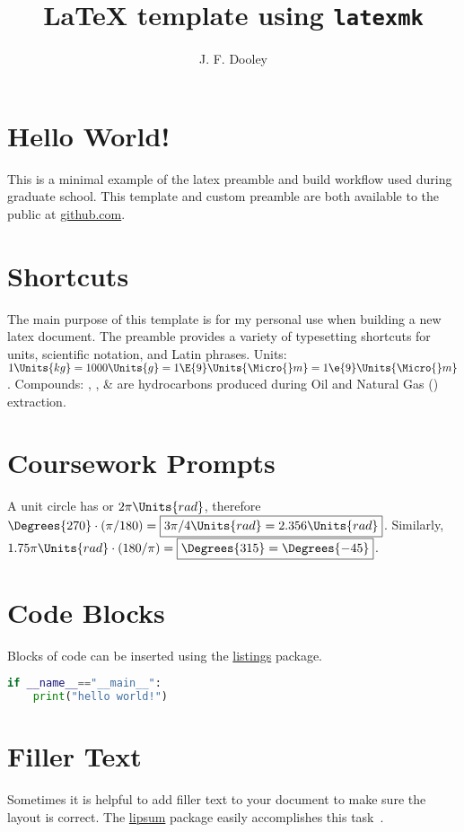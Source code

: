 \documentclass[12pt]{article}
\author{J. F. Dooley}
\title{\LaTeX{} template using \texttt{latexmk}}
\begin{document}
\maketitle

\section{Hello World!}
This is a minimal example of the latex preamble and build workflow used during graduate school.
This template and custom preamble are both available to the public at \href{https://github.com/jfdoolster}{github.com}.

\section{Shortcuts}
The main purpose of this template is for my personal use when building a new latex document. The preamble provides a variety of typesetting shortcuts for units, scientific notation, and Latin phrases.
%
Units: $1\Units{kg} = 1000\Units{g} = 1\E{9}\Units{\Micro{}m} = 1\e{9}\Units{\Micro{}m}$.
%
Compounds: \Methane{}, \CarbonDioxide{}, \& \Ethane{} are hydrocarbons produced during Oil and Natural Gas (\ONG{}) extraction.

\section{Coursework Prompts}

%
A unit circle has  or $2\pi\Units{rad}$, therefore $\Degrees{270} \cdot \left(\pi/180\right) = \boxed{3\pi/4 \Units{rad} = 2.356\Units{rad}}$. Similarly, $1.75\pi\Units{rad} \cdot \left(180/\pi\right) = \boxed{\Degrees{315} = \Degrees{-45}}$.


\section{Code Blocks}
Blocks of code can be inserted using the \href{hhttps://ctan.org/pkg/listings}{listings} package.

\begin{lstlisting}[language=Python, caption={Python Code Example}]
if __name__=="__main__":
    print("hello world!")
\end{lstlisting}





\section{Filler Text}
Sometimes it is helpful to add filler text to your document to make sure the layout is correct. The \href{https://ctan.org/pkg/lipsum}{lipsum} package easily accomplishes this task~\cite{LaTeX2020,Kerrisk2010}.
\lipsum[1]




\end{document}

